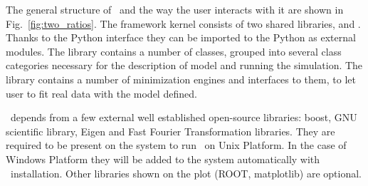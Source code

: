 The general structure of \BornAgain\ and the way the user interacts with it are
shown in Fig.~\ref{fig:two_ratios}.
The framework kernel consists of two shared libraries,  and
. Thanks to the Python interface they can be imported to the Python as external modules. The library  contains a number of classes, grouped into several class categories necessary for the description of model and running the simulation.
The library   contains a number of minimization engines 
and interfaces to them, to let user to fit real data with the model defined.

\BornAgain\ depends from a few external well established open-source libraries: boost, GNU scientific library, Eigen and Fast Fourier Transformation libraries. They are required to be present on the system to run \BornAgain\ on Unix Platform. In the case of Windows Platform they will be added to the system automatically with \BornAgain\ installation. Other libraries shown
on the plot (ROOT, matplotlib) are optional.

 








